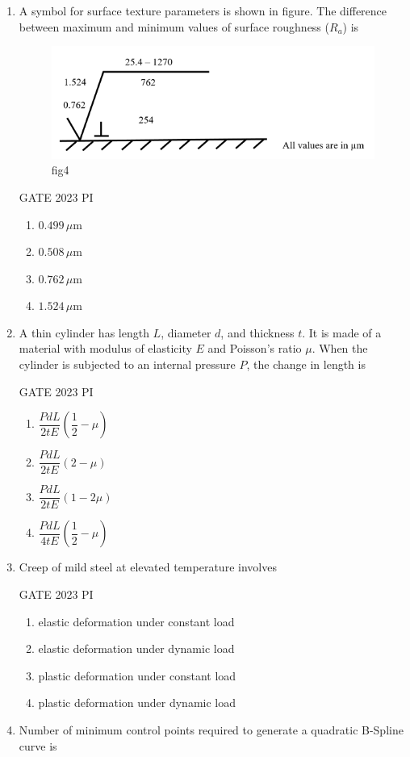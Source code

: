 \documentclass[journal,12pt,onecolumn]{IEEEtran}
\theoremstyle{remark}
\begin{document}
\begin{enumerate}
\item A symbol for surface texture parameters is shown in figure. The difference between maximum and minimum values of surface roughness ($R_a$) is
\begin{figure}
    \centering
    \includegraphics[width=0.5\linewidth]{figs/Q.23.png}
    \caption{fig4}
    \label{fig:figs/Q.23.png}
\end{figure}
\hfill{GATE 2023 PI}
\begin{multicols}{2}
\begin{enumerate}
    \item $0.499\,\mu\text{m}$
    \item $0.508\,\mu\text{m}$
    \item $0.762\,\mu\text{m}$
    \item $1.524\,\mu\text{m}$
\end{enumerate}
\end{multicols}

\item A thin cylinder has length $L$, diameter $d$, and thickness $t$. It is made of a material with modulus of elasticity $E$ and Poisson's ratio $\mu$. When the cylinder is subjected to an internal pressure $P$, the change in length is

\hfill{GATE 2023 PI}

\begin{multicols}{2}
\begin{enumerate}
    \item $\dfrac{PdL}{2tE}\left(\dfrac{1}{2} - \mu\right)$
    \item $\dfrac{PdL}{2tE}(2 - \mu)$
    \item $\dfrac{PdL}{2tE}(1 - 2\mu)$
    \item $\dfrac{PdL}{4tE}\left(\dfrac{1}{2} - \mu\right)$
\end{enumerate}
\end{multicols}

\item Creep of mild steel at elevated temperature involves

\hfill{GATE 2023 PI}

\begin{multicols}{2}
\begin{enumerate}
    \item elastic deformation under constant load
    \item elastic deformation under dynamic load
    \item plastic deformation under constant load
    \item plastic deformation under dynamic load
\end{enumerate}
\end{multicols}
\item Number of minimum control points required to generate a quadratic B-Spline curve is


\end{enumerate}
\end{document}
